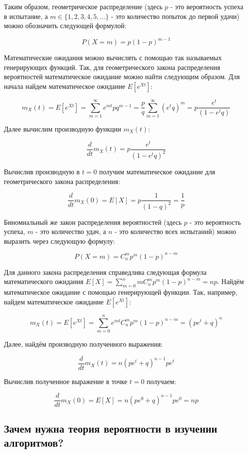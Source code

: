 Таким образом, геометрическое распределение (здесь $p$ - это 
вероятность успеха в испытание, а $m \in \{1, 2, 3, 4, 5, \ldots\}$ - это 
количество попыток до первой удачи) можно обозначить следующей 
формулой:

$$P(X=m)=p(1-p)^{m-1}$$

Математические ожидания можно вычислять с помощью так называемых 
генерирующих функций. Так, для геометрического закона распределения 
вероятностей математическое ожидание можно найти следующим образом.
Для начала найдем математическое ожидание $E[e^{Xt}]$:


$$m_X(t) = E[e^{Xt}] = \sum_{m=1}^{\infty} e^{mt}pq^{m-1} = 
\frac{p}{q}\sum_{m=1}^{\infty} (e^{t}q)^{m} = p\frac{e^t}{(1-e^tq)}$$

Далее вычислим производную функции $m_X(t)$:

$$\frac{d}{dt}m_X(t) = p\frac{e^t}{(1-e^tq)^2}$$

Вычислив производную в $t=0$ получим математическое ожидание для
геометрического закона распределения:

$$\frac{d}{dt}m_X(0) = E[X] = p\frac{1}{(1-q)^2}=\frac{1}{p}$$

Биномиальный же закон распределения вероятностей (здесь $p$ - это вероятность успеха, 
$m$ - это количество удач, а $n$ - это количество всех испытаний) можно выразить через 
следующую формулу:

$$P(X=m)=C^m_np^{m}(1-p)^{n-m}$$

Для данного закона распределения справедлива следующая формула математического 
ожидания $E[X]=\sum_{m=0}^n mC^m_np^{m}(1-p)^{n-m} = np$.  Найдём математическое 
ожидание с помощью генерирующей функции. Так, например, найдем математическое 
ожидание $E[e^{Xt}]$:

$$m_X(t) = E[e^{Xt}] = \sum_{m=0}^n e^{mt}C^m_np^{m}(1-p)^{n-m} = (pe^t+q)^n$$

Далее, найдём производную полученного выражения:

$$\frac{d}{dt}m_X(t) = n(pe^t+q)^{n-1}pe^t$$

Вычислив полученное выражение в точке $t=0$ получаем: 

$$\frac{d}{dt}m_X(0) = E[X] = n(pe^0+q)^{n-1}pe^0 = np$$

\subsection{Зачем нужна теория вероятности в изучении алгоритмов?}

